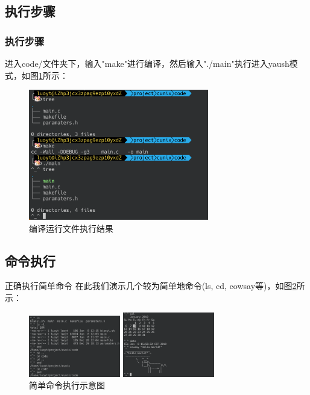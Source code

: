 \documentclass[10pt]{beamer}
\begin{document}
\subsection{执行步骤}
\begin{frame}
\frametitle{执行步骤}
进入code/文件夹下，输入"make"进行编译，然后输入"./main"执行进入yaush模式，如图\ref{init}所示：
\begin{figure}[htbp]
	\centering
	\includegraphics[width=0.7\textwidth]{images/init}
	\caption{\label{init}编译运行文件执行结果}
\end{figure}
\end{frame}

\subsection{命令执行}
\begin{frame}{正确执行简单命令}
在此我们演示几个较为简单地命令(ls, cd, cowsay等)，如图\ref{base}所示：
\begin{figure}
	\centering
	\begin{minipage}[t]{0.45\textwidth}
		\centering
		\includegraphics[width=4cm]{images/base1}
	\end{minipage}
	\begin{minipage}[t]{0.45\textwidth}
		\centering
		\includegraphics[width=4cm]{images/base2}
	\end{minipage}
	\caption{\label{base}简单命令执行示意图}
\end{figure}

\end{frame}
\end{document}
